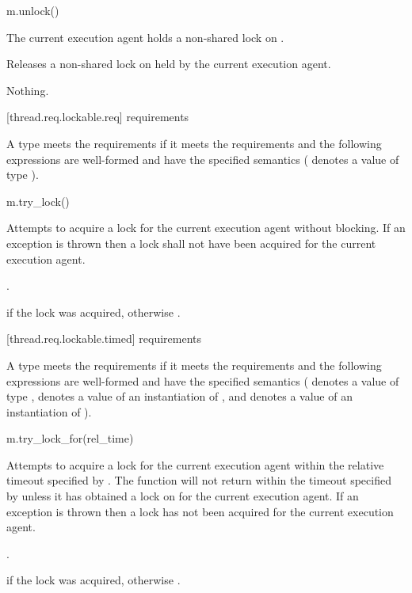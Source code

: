\begin{itemdecl}
m.unlock()
\end{itemdecl}

\begin{itemdescr}
\pnum
\expects
The current execution agent holds a non-shared lock on .

\pnum
\effects
Releases a non-shared lock on  held by the current execution agent.

\pnum
\throws
Nothing.
\end{itemdescr}

[thread.req.lockable.req]{ requirements}

\pnum
A type  meets the  requirements if it meets the 
requirements and the following expressions are well-formed and have the specified semantics
( denotes a value of type ).

\begin{itemdecl}
m.try_lock()
\end{itemdecl}

\begin{itemdescr}
\pnum
\effects
Attempts to acquire a lock for the current execution agent without blocking. If an
exception is thrown then a lock shall not have been acquired for the current execution agent.

\pnum
\returntype {}.

\pnum
\returns
{} if the lock was acquired, otherwise .
\end{itemdescr}

[thread.req.lockable.timed]{ requirements}

\pnum
A type  meets the  requirements if it meets the 
requirements and the following expressions are well-formed and have the specified semantics
( denotes a value of type ,  denotes a value of an
instantiation of , and  denotes a value
of an instantiation of ).

\begin{itemdecl}
m.try_lock_for(rel_time)
\end{itemdecl}

\begin{itemdescr}
\pnum
\effects
Attempts to acquire a lock for the current execution agent within the relative
timeout specified by . The function will not return
within the timeout specified by  unless it has obtained a lock on 
for the current execution agent. If an exception is thrown then a lock has not been
acquired for the current execution agent.

\pnum
\returntype {}.

\pnum
\returns
{} if the lock was acquired, otherwise .
\end{itemdescr}

